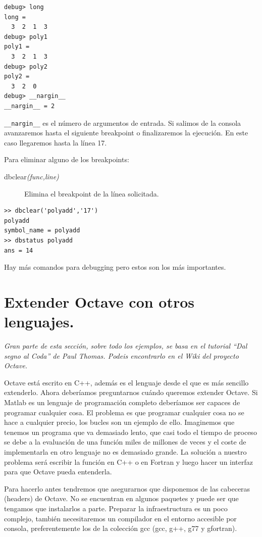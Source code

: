   \begin{verbatim}
debug> long
long =
  3  2  1  3
debug> poly1
poly1 =
  3  2  1  3
debug> poly2
poly2 =
  3  2  0
debug> __nargin__
__nargin__ = 2
\end{verbatim}
\texttt{\_\_nargin\_\_} es el número de argumentos de entrada. Si
salimos de la consola avanzaremos hasta el siguiente breakpoint o
finalizaremos la ejecución. En este caso llegaremos hasta la línea 17.

Para eliminar alguno de los breakpoints:

\begin{description}
\item [{dbclear\textsl{(func,line)}}]Elimina el
  breakpoint de la línea solicitada.
\end{description}
\begin{verbatim}
>> dbclear('polyadd','17')
polyadd
symbol_name = polyadd
>> dbstatus polyadd
ans = 14
\end{verbatim}
Hay más comandos para debugging pero estos son los más importantes.


\section{Extender Octave con otros
  lenguajes.\label{sec:Extender-Octave-con}}

\emph{Gran parte de esta sección, sobre todo los ejemplos, se basa en
  el tutorial {}``Dal segno al Coda'' de Paul Thomas. Podeis
  encontrarlo en el Wiki del proyecto Octave.}

Octave está escrito en C++, además es el lenguaje desde el que es más
sencillo extenderlo. Ahora deberíamos preguntarnos cuándo queremos
extender Octave. Si Matlab es un lenguaje de programación completo
deberíamos ser capaces de programar cualquier cosa. El problema es que
programar cualquier cosa no se hace a cualquier precio, los bucles son
un ejemplo de ello. Imaginemos que tenemos un programa que va
demasiado lento, que casi todo el tiempo de proceso se debe a la
evaluación de una función miles de millones de veces y el coste de
implementarla en otro lenguaje no es demasiado grande. La solución a
nuestro problema será escribir la función en C++ o en Fortran y luego
hacer un interfaz para que Octave pueda entenderla.

Para hacerlo antes tendremos que asegurarnos que disponemos de las
cabeceras (headers) de Octave. No se encuentran en algunos paquetes y
puede ser que tengamos que instalarlos a parte. Preparar la
infraestructura es un poco complejo, también necesitaremos un
compilador en el entorno accesible por consola, preferentemente los de
la colección gcc (gcc, g++, g77 y gfortran).

